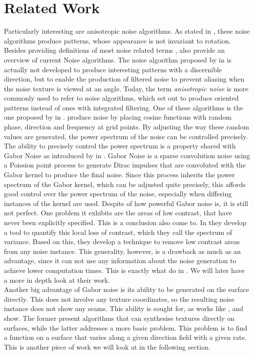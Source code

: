 \documentclass{utue} %
\begin{document}
\section{Related Work}
Particularly interesting are anisotropic noise algorithms. As stated in \cite{survey}, these noise algorithms produce patterns, whose appearance is not invariant to rotation. Besides providing definitions of most noise related terms \citeauthor{survey}, also provide an overview of current Noise algorithms. The noise algorithm proposed by \citeauthor{anisotropicNoise} in \cite{anisotropicNoise} is actually not developed to produce interesting patterns with a discernible direction, but to enable the production of filtered noise to prevent aliasing when the noise texture is viewed at an angle. Today, the term \textit{anisotropic noise} is more commonly used to refer to noise algorithms, which set out to produce oriented patterns instead of ones with integrated filtering. One of these algorithms is the one proposed by \citeauthor{randomPhaseNoise} in \cite{randomPhaseNoise}. \citeauthor{randomPhaseNoise} produce noise by placing cosine functions with random phase, direction and frequency at grid points. By adjusting the way these random values are generated, the power spectrum of the noise can be controlled precisely. The ability to precisely control the power spectrum is a property shared with Gabor Noise as introduced by \citeauthor{gaborNoise} in \cite{gaborNoise}. Gabor Noise is a sparse convolution noise using a Poission point process to generate Dirac impulses that are convoluted with the Gabor kernel to produce the final noise. Since this process inherits the power spectrum of the Gabor kernel, which can be adjusted quite precisely, this affords good control over the power spectrum of the noise, especially when differing instances of the kernel are used. Despite of how powerful Gabor noise is, it is still not perfect. One problem it exhibits are the areas of low contrast, that have never been explicitly specified. This is a conclusion \citeauthor{spectrumOfVariance} also come to. In \cite{spectrumOfVariance} they develop a tool to quantify this local loss of contrast, which they call the spectrum of variance. Based on this, they develop a technique to remove low contrast areas from any noise instance. This generality, however, is a drawback as much as an advantage, since it can not use any information about the noise generation to achieve lower computation times. This is exactly what \citeauthor{phasorNoise} do in \cite{phasorNoise}. We will later have a more in depth look at their work.\\
Another big advantage of Gabor noise is its ability to be generated on the surface directly. This does not involve any texture coordinates, so the resulting noise instance does not show any seams. This ability is sought for, as works like \cite{appearanceTextureSynthesis}, \cite{textureSynthesis} and \cite{stripes} show. The former present algorithms that can synthesise textures directly on surfaces, while the latter addresses a more basic problem. This problem is to find a function on a surface that varies along a given direction field with a given rate. This is another piece of work we will look at in the following section.
\end{document}
